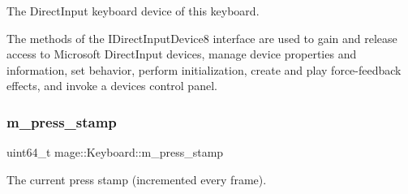 The Direct\+Input keyboard device of this keyboard.

The methods of the I\+Direct\+Input\+Device8 interface are used to gain and release access to Microsoft Direct\+Input devices, manage device properties and information, set behavior, perform initialization, create and play force-\/feedback effects, and invoke a device\textquotesingle{}s control panel. \hypertarget{classmage_1_1_keyboard_a2c638a93d1f61d9d3578a0df8b6a1c39}{}\label{classmage_1_1_keyboard_a2c638a93d1f61d9d3578a0df8b6a1c39} 
\subsubsection{\texorpdfstring{m\+\_\+press\+\_\+stamp}{m\_press\_stamp}}
{\footnotesize\ttfamily uint64\+\_\+t mage\+::\+Keyboard\+::m\+\_\+press\+\_\+stamp\hspace{0.3cm}{\ttfamily [private]}}

The current press stamp (incremented every frame). 